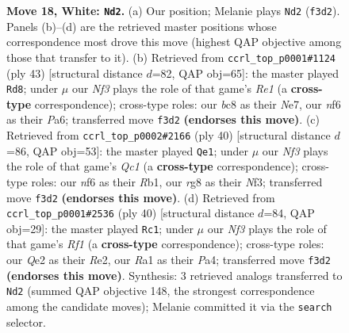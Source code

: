 \documentclass[11pt]{article}
\begin{document}
\begin{figure}[p]
\caption{\textbf{Move 18, White: \texttt{Nd2}.} (a) Our position; Melanie plays \texttt{Nd2} (\texttt{f3d2}). Panels (b)--(d) are the retrieved master positions whose correspondence most drove this move (highest QAP objective among those that transfer to it). (b) Retrieved from \texttt{ccrl\_top\_p0001\#1124} (ply 43) [structural distance $d$=82, QAP obj=65]: the master played \texttt{Rd8}; under $\mu$ our \emph{Nf3} plays the role of that game's \emph{Re1} (a \textbf{cross-type} correspondence); cross-type roles: our \emph{b}c8 as their \emph{N}e7, our \emph{n}f6 as their \emph{P}a6; transferred move \texttt{f3d2} \textbf{(endorses this move)}. (c) Retrieved from \texttt{ccrl\_top\_p0002\#2166} (ply 40) [structural distance $d$=86, QAP obj=53]: the master played \texttt{Qe1}; under $\mu$ our \emph{Nf3} plays the role of that game's \emph{Qc1} (a \textbf{cross-type} correspondence); cross-type roles: our \emph{n}f6 as their \emph{R}b1, our \emph{r}g8 as their \emph{N}f3; transferred move \texttt{f3d2} \textbf{(endorses this move)}. (d) Retrieved from \texttt{ccrl\_top\_p0001\#2536} (ply 40) [structural distance $d$=84, QAP obj=29]: the master played \texttt{Rc1}; under $\mu$ our \emph{Nf3} plays the role of that game's \emph{Rf1} (a \textbf{cross-type} correspondence); cross-type roles: our \emph{Q}e2 as their \emph{R}e2, our \emph{R}a1 as their \emph{P}a4; transferred move \texttt{f3d2} \textbf{(endorses this move)}. Synthesis: 3 retrieved analogs transferred to \texttt{Nd2} (summed QAP objective 148, the strongest correspondence among the candidate moves); Melanie committed it via the \texttt{search} selector.}
\label{fig:thought-m34}
\end{figure}

\clearpage
\end{document}
